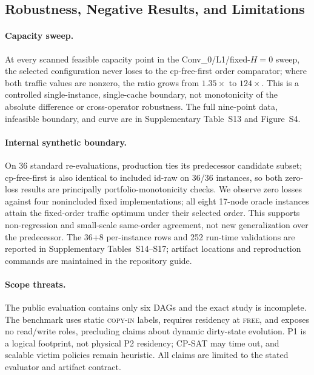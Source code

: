 \subsection{Robustness, Negative Results, and Limitations}\label{sec:limitations}

\paragraph{Capacity sweep.}
At every scanned feasible capacity point in the Conv\_0/L1/fixed-$H=0$ sweep,
the selected configuration never loses to the cp-free-first order comparator;
where both traffic values are nonzero, the ratio grows from $1.35\times$ to
$124\times$. This is a controlled single-instance, single-cache boundary, not
monotonicity of the absolute difference or cross-operator robustness. The full
nine-point data, infeasible boundary, and curve are in Supplementary Table~S13
and Figure~S4.

\paragraph{Internal synthetic boundary.}
On 36 standard re-evaluations, production ties its predecessor candidate subset;
cp-free-first is also identical to included id-raw on 36/36 instances, so both
zero-loss results are principally portfolio-monotonicity checks. We observe zero
losses against four nonincluded fixed implementations; all eight 17-node oracle
instances attain the fixed-order traffic optimum under their selected order.
This supports non-regression and small-scale same-order agreement, not new
generalization over the predecessor. The 36+8 per-instance rows and 252
run-time validations are reported in Supplementary Tables~S14--S17; artifact
locations and reproduction commands are maintained in the repository guide.

\paragraph{Scope threats.}
The public evaluation contains only six DAGs and the exact study is incomplete.
The benchmark uses static \textsc{copy-in} labels, requires residency at
\textsc{free}, and exposes no read/write roles, precluding claims about dynamic
dirty-state evolution. P1 is a logical footprint, not physical P2 residency;
CP-SAT may time out, and scalable victim policies remain heuristic. All claims
are limited to the stated evaluator and artifact contract.

